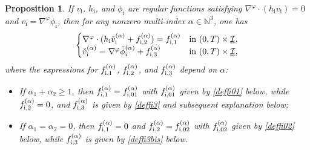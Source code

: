 \documentclass[10pt]{amsart}
\newcommand{\cI}{{\mathcal I}}
\newcommand{\ul}[1]{\underline{#1}}
\newtheorem{proposition}[theorem]{Proposition}
\theoremstyle{definition}
\begin{document}
\begin{proposition}\label{propGUinterior}
If $v_\mathrm{i}$, $h_\mathrm{i}$, and $\phi_\mathrm{i}$ are regular functions satisfying $\nabla^\varphi\cdot (h_\mathrm{i}v_\mathrm{i})=0$ and
$v_\mathrm{i}=\nabla^\varphi \phi_\mathrm{i}$, then for any nonzero multi-index $\alpha\in {\mathbb N}^3$, one has
\begin{equation}\label{QLSWEi}
\begin{cases}
\nabla^\varphi\cdot(h_\mathrm{i}\check{v}_\mathrm{i}^{(\alpha)}+f_{{\rm i},2}^{(\alpha)}) = f_{{\rm i},1}^{(\alpha)} &\text{in } (0,T)\times\ul{\cI}, \\
\check{v}_\mathrm{i}^{(\alpha)} = \nabla^\varphi \check{\phi}_\mathrm{i}^{(\alpha)}+f_{{\rm i},3}^{(\alpha)} &\text{in } (0,T)\times\ul{\cI},
\end{cases}
\end{equation}
where the expressions for $f_{{\rm i},1}^{(\alpha)}$, $f_{{\rm i},2}^{(\alpha)}$, and $f_{{\rm i},3}^{(\alpha)}$ depend on $\alpha$:
\begin{itemize}
\item
If $\alpha_1+\alpha_2\geq 1$,
then $f_{{\rm i},1}^{(\alpha)}=f_{{\rm i},01}^{(\alpha)} $ with $f_{{\rm i},01}^{(\alpha)} $ given by \eqref{deffi01} below,
while $f_{{\rm i},2}^{(\alpha)}=0$, and $f_{{\rm i},3}^{(\alpha)}$ is given by \eqref{deffi3} and subsequent explanation below;
\item
If $\alpha_1=\alpha_2=0$,
then $f_{{\rm i},1}^{(\alpha)}=0 $ and $f_{{\rm i},2}^{(\alpha)}=f_{{\rm i},02}^{(\alpha)} $ with $f_{{\rm i},02}^{(\alpha)} $ given by \eqref{deffi02} below,
while $f_{{\rm i},3}^{(\alpha)}$ is given by \eqref{deffi3bis} below.
\end{itemize}
\end{proposition}
\end{document}
